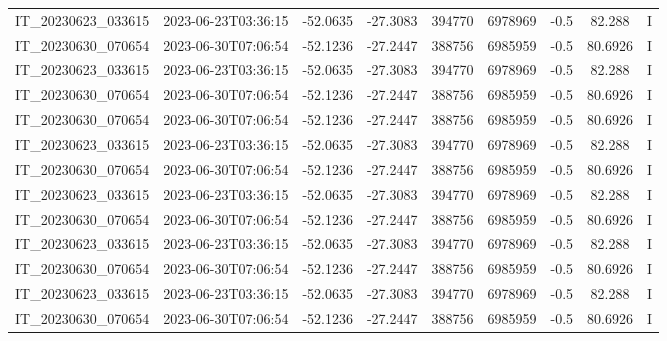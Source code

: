 \begin{small}
\begin{longtable}{ccccccccc}
IT\_20230623\_033615 & 2023-06-23T03:36:15 & -52.0635 & -27.3083 & 394770 & 6978969 & -0.5 & \num[round-precision=3,round-mode=figures,scientific-notation=true]{82.288} & I \\
IT\_20230630\_070654 & 2023-06-30T07:06:54 & -52.1236 & -27.2447 & 388756 & 6985959 & -0.5 & \num[round-precision=3,round-mode=figures,scientific-notation=true]{80.6926} & I \\
IT\_20230623\_033615 & 2023-06-23T03:36:15 & -52.0635 & -27.3083 & 394770 & 6978969 & -0.5 & \num[round-precision=3,round-mode=figures,scientific-notation=true]{82.288} & I \\
IT\_20230630\_070654 & 2023-06-30T07:06:54 & -52.1236 & -27.2447 & 388756 & 6985959 & -0.5 & \num[round-precision=3,round-mode=figures,scientific-notation=true]{80.6926} & I \\
IT\_20230630\_070654 & 2023-06-30T07:06:54 & -52.1236 & -27.2447 & 388756 & 6985959 & -0.5 & \num[round-precision=3,round-mode=figures,scientific-notation=true]{80.6926} & I \\
IT\_20230623\_033615 & 2023-06-23T03:36:15 & -52.0635 & -27.3083 & 394770 & 6978969 & -0.5 & \num[round-precision=3,round-mode=figures,scientific-notation=true]{82.288} & I \\
IT\_20230630\_070654 & 2023-06-30T07:06:54 & -52.1236 & -27.2447 & 388756 & 6985959 & -0.5 & \num[round-precision=3,round-mode=figures,scientific-notation=true]{80.6926} & I \\
IT\_20230623\_033615 & 2023-06-23T03:36:15 & -52.0635 & -27.3083 & 394770 & 6978969 & -0.5 & \num[round-precision=3,round-mode=figures,scientific-notation=true]{82.288} & I \\
IT\_20230630\_070654 & 2023-06-30T07:06:54 & -52.1236 & -27.2447 & 388756 & 6985959 & -0.5 & \num[round-precision=3,round-mode=figures,scientific-notation=true]{80.6926} & I \\
IT\_20230623\_033615 & 2023-06-23T03:36:15 & -52.0635 & -27.3083 & 394770 & 6978969 & -0.5 & \num[round-precision=3,round-mode=figures,scientific-notation=true]{82.288} & I \\
IT\_20230630\_070654 & 2023-06-30T07:06:54 & -52.1236 & -27.2447 & 388756 & 6985959 & -0.5 & \num[round-precision=3,round-mode=figures,scientific-notation=true]{80.6926} & I \\
IT\_20230623\_033615 & 2023-06-23T03:36:15 & -52.0635 & -27.3083 & 394770 & 6978969 & -0.5 & \num[round-precision=3,round-mode=figures,scientific-notation=true]{82.288} & I \\
IT\_20230630\_070654 & 2023-06-30T07:06:54 & -52.1236 & -27.2447 & 388756 & 6985959 & -0.5 & \num[round-precision=3,round-mode=figures,scientific-notation=true]{80.6926} & I \\

\end{longtable}
\end{small}

